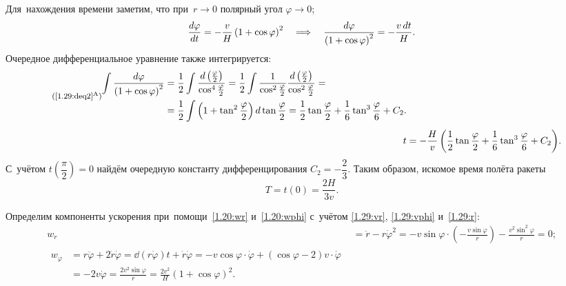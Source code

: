 \documentclass{weekly}
\begin{document}
Для~нахождения времени заметим, что при~$r \to 0$
полярный угол $\varphi \to 0$;
\begin{align}
    \frac{d \varphi}{d t} = -\frac{v}{H} \left(1+\cos\varphi\right)^2 \quad \Longrightarrow \quad
    \frac{d\varphi}{\left(1+\cos\varphi\right)^2} = -\frac{v\,dt}{H}.
        \label{1.29:deq2}
\end{align}
Очередное дифференциальное уравнение также интегрируется:
\begin{align}
\tag*{\footnotesize(\ref{1.29:deq2}$^\text{A}$)}
\begin{split}
    \int \frac{d\varphi}{\left(1+\cos\varphi\right)^2}
        &= \frac{1}{2} \int \frac{d\left(\frac{\varphi}{2}\right)}
            {\cos^4 \frac{\varphi}{2}}
        = \frac{1}{2} \int \frac{1}{\cos^2 \frac{\varphi}{2}}
            \frac{d\left(\frac{\varphi}{2}\right)}
            {\cos^2 \frac{\varphi}{2}} = \\
        &= \frac{1}{2} \int \left(1 + \tan^2 \frac{\varphi}{2}\right)
            d\tan\frac{\varphi}{2}
        = \frac{1}{2}\tan\frac{\varphi}{2} +
            \frac{1}{6}\tan^3\frac{\varphi}{6} + C_2.
\end{split} \\[1ex]
    t &= -\frac{H}{v} \left( \frac{1}{2}\tan\frac{\varphi}{2} +
            \frac{1}{6}\tan^3\frac{\varphi}{6} + C_2 \right)\!.
\end{align}
С~учётом $t\!\left(\dfrac{\pi}{2}\right) = 0$ найдём
очередную константу дифференцирования $C_2 = -\dfrac{2}{3}$.
Таким образом, искомое время полёта ракеты
\begin{equation}
    T = t(0) = \frac{2H}{3v}.
\end{equation}

Определим компоненты ускорения при~помощи~\eqref{1.20:wr}
и~\eqref{1.20:wphi} с~учётом \eqref{1.29:vr}, \eqref{1.29:vphi}
и~\eqref{1.29:r}:
\begin{align}
    w_r &= \ddot r - r \dot\varphi^2 = -v \sin\varphi \cdot
            \left(-\frac{v \sin\varphi}{r}\right) -
            \frac{v^2 \sin^2\varphi}{r} = 0; \\
\begin{split}
    w_\varphi &= r \ddot\varphi + 2 \dot r \dot\varphi
        = \dd{(r \dot\varphi)}{t} + \dot r \dot\varphi
        = -v \cos\varphi \cdot \dot\varphi +
            (\cos\varphi - 2) v \cdot \dot\varphi \\
        &= -2v \dot\varphi = \frac{2v^2 \sin\varphi}{r}
        = \frac{2v^2}{H} \left( 1 + \cos\varphi \right)^2.
\end{split}
\end{align}
\end{document}

